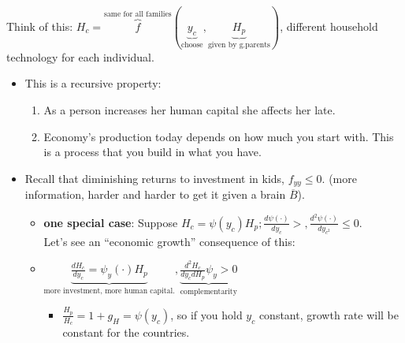 \documentclass[14pt,notitlepage]{article}
\begin{document}
\begin{itemize}
Think of this: $H_c = \overbrace{f}^{\text{same for all families}}(\underbrace{y_c}_{\text{choose}}, \underbrace{H_p}_{\text{given by g.parents}})$, different household technology for each individual.
    \begin{itemize}
    \item This is a recursive property:
        \begin{enumerate}[1.]
        \item As a person increases her human capital she affects her late.
        \item Economy's production today depends on how much you start with. This is a process that you build in what you have.
        \end{enumerate}
    \item Recall that diminishing returns to investment in kids, $f_{yy} \leq 0$. (more information, harder and harder to get it given a brain $\overline{B}$).
        \begin{itemize}
        \item \textbf{one special case}: Suppose $H_c = \psi(y_c) H_p; \frac{d\psi(\cdot)}{dy_c} >, \frac{d^2\psi(\cdot)}{dy_{c^2}} \leq 0$. \\
        Let's see an ``economic growth'' consequence of this:
        \item $\underbrace{\frac{dH_c}{dy_c} = \psi_y(\cdot) H_p}_{\text{more investment, more human capital.}}, \underbrace{\frac{d^2H_c}{dy_c dH_p} \psi_y > 0}_{\text{complementarity}}$
            \begin{itemize}
            \item $\frac{H_p}{H_c} = 1 + g_H = \psi(y_c)$, so if you hold $y_c$ constant, growth rate will be constant for the countries.
            \end{itemize}
        \end{itemize}
    \end{itemize}


\end{itemize}
\end{document}
